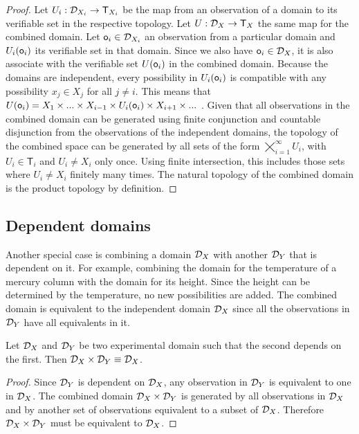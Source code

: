 \documentclass[11pt,letterpaper,fleqn]{memoir} %
\begin{document}
\begin{mathSection}
\begin{proof}
	Let $U_i : \mathcal{D}_{X_i} \to \mathsf{T}_{X_i}$ be the map from an observation of a domain to its verifiable set in the respective topology. Let $U : \mathcal{D}_{X} \to \mathsf{T}_X$ the same map for the combined domain. Let $\mathsf{o}_i \in \mathcal{D}_{X_i}$ an observation from a particular domain and $U_i(\mathsf{o}_i)$ its verifiable set in that domain. Since we also have $\mathsf{o}_i \in \mathcal{D}_{X}$, it is also associate with the verifiable set $U(\mathsf{o}_i)$ in the combined domain. Because the domains are independent, every possibility in $U_i(\mathsf{o}_i)$ is compatible with any possibility $x_j \in X_j$ for all $j \neq i$. This means that $U(\mathsf{o}_i)=X_1\times ... \times X_{i-1} \times U_i(\mathsf{o}_i) \times X_{i+1} \times ...$ . Given that all observations in the combined domain can be generated using finite conjunction and countable disjunction from the observations of the independent domains, the topology of the combined space can be generated by all sets of the form $\bigtimes\limits_{i=1}^{\infty} U_{i}$, with $U_i \in \mathsf{T}_i$ and $U_i \neq X_i$ only once. Using finite intersection, this includes those sets where $U_i \neq X_i$ finitely many times. The natural topology of the combined domain is the product topology by definition.
\end{proof}
\end{mathSection}

\subsection{Dependent domains}

Another special case is combining a domain $\mathcal{D}_X$ with another $\mathcal{D}_Y$ that is dependent on it. For example, combining the domain for the temperature of a mercury column with the domain for its height. Since the height can be determined by the temperature, no new possibilities are added. The combined domain is equivalent to the independent domain $\mathcal{D}_X$ since all the observations in $\mathcal{D}_Y$ have all equivalents in it.

\begin{mathSection}
	\begin{prop}
		Let $\mathcal{D}_X$ and $\mathcal{D}_Y$ be two experimental domain such that the second depends on the first. Then $\mathcal{D}_X \times \mathcal{D}_Y \equiv \mathcal{D}_X$.
	\end{prop}
	\begin{proof}
		Since $\mathcal{D}_Y$ is dependent on $\mathcal{D}_X$, any observation in $\mathcal{D}_Y$ is equivalent to one in $\mathcal{D}_X$. The combined domain $\mathcal{D}_X \times \mathcal{D}_Y$ is generated by all observations in $\mathcal{D}_X$ and by another set of observations equivalent to a subset of $\mathcal{D}_X$. Therefore $\mathcal{D}_X \times \mathcal{D}_Y$ must be equivalent to $\mathcal{D}_X$. 
	\end{proof}
\end{mathSection}
\end{document}

